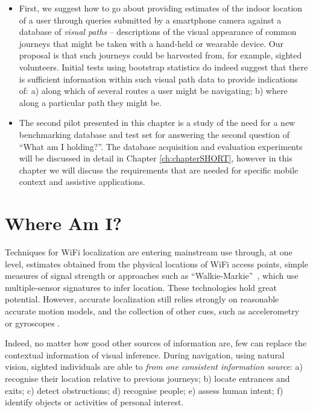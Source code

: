 \begin{itemize}
\item First, we suggest how to go about providing estimates of the indoor location of a user through queries submitted by a smartphone camera against a database of {\em visual paths} -- descriptions of the visual appearance of common journeys that might be taken with a hand-held or wearable device. Our proposal is that such journeys could be harvested from, for example, sighted volunteers. Initial tests using bootstrap statistics do indeed suggest that there is sufficient information within such visual path data to provide indications of: a) along which of several routes a user might be navigating; b) where along a particular path they might be.
\item The second pilot presented in this chapter is a study of the need for a new benchmarking database and test set for answering the second question of ``What am I holding?''. The database acquisition and evaluation experiments will be discussed in detail in Chapter \ref{ch:chapterSHORT}, however in this chapter we will discuss the requirements that are needed for specific mobile context and assistive applications.
\end{itemize}




\section{Where Am I?}

Techniques for WiFi localization are entering mainstream use through, at one level, estimates obtained from the physical locations of WiFi access points, simple measures of signal strength or approaches such as ``Walkie-Markie''~\cite{Shen}, which use multiple-sensor signatures to infer location.  These technologies hold great potential.  However, accurate localization still relies strongly on reasonable accurate motion models, and the collection of other cues, such as accelerometry or gyroscopes \cite{Wang2012}.  

Indeed, no matter how good other sources of information are, few can replace the contextual information of visual inference.  During navigation, using natural vision, sighted individuals are able to {\em from one consistent information source}: a) recognise their location relative to previous journeys; b) locate entrances and exits; c) detect obstructions; d) recognise people; e) assess human intent;
f) identify objects or activities of personal interest.

